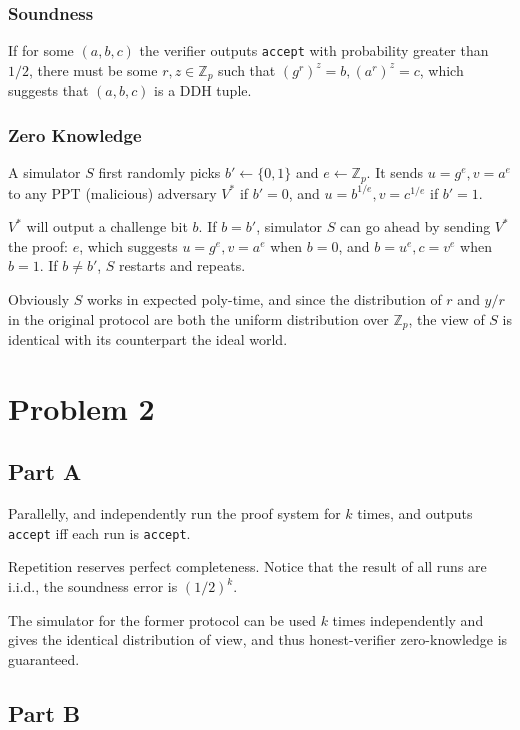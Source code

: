 \documentclass[8pt]{article}
\theoremstyle{compact}
\begin{document}
\subsubsection*{Soundness}

If for some $(a, b, c)$ the verifier outputs \texttt{accept} with probability greater than $1/2$, there must be some $r, z \in \mathbb Z_p$ such that $(g^r)^z = b, (a^r)^z = c$, which suggests that $(a, b, c)$ is a DDH tuple.

\subsubsection*{Zero Knowledge}

A simulator $S$ first randomly picks $b' \gets \{0, 1\}$ and $e \gets \mathbb Z_p$. It sends $u = g^e, v = a^e$ to any PPT (malicious) adversary $V^*$ if $b' = 0$, and $u = b^{1/e}, v = c^{1/e}$ if $b' = 1$.

$V^*$ will output a challenge bit $b$. If $b = b'$, simulator $S$ can go ahead by sending $V^*$ the proof: $e$, which suggests $u = g^e, v = a^e$ when $b = 0$, and $b = u^{e}, c = v^e$ when $b = 1$. If $b \neq b'$, $S$ restarts and repeats.

Obviously $S$ works in expected poly-time, and since the distribution of $r$ and $y/r$ in the original protocol are both the uniform distribution over $\mathbb Z_p$, the view of $S$ is identical with its counterpart the ideal world.

\section*{Problem 2}
\subsection*{Part A}
Parallelly, and independently run the proof system for $k$ times, and outputs \texttt{accept} iff each run is \texttt{accept}.

Repetition reserves perfect completeness. Notice that the result of all runs are i.i.d., the soundness error is $(1 / 2)^k$. 

The simulator for the former protocol can be used $k$ times independently and gives the identical distribution of view, and thus honest-verifier zero-knowledge is guaranteed.

\subsection*{Part B}
\end{document}
